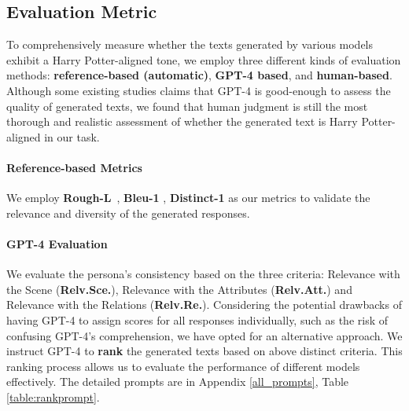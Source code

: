 \documentclass[11pt]{article}
\begin{document}
 \label{experiments}


\subsection{Evaluation Metric}
\label{evaluation_metric}


To comprehensively measure whether the texts generated by various models exhibit a Harry Potter-aligned tone, we employ three different kinds of evaluation methods: \textbf{reference-based (automatic)}, \textbf{GPT-4 based}, and \textbf{human-based}. Although some existing studies \cite{liu2023evaluate,peng2023instruction} claims that GPT-4 is good-enough to assess the quality of generated texts, we found that human judgment is still the most thorough and realistic assessment of whether the generated text is Harry Potter-aligned in our task.



\paragraph{Reference-based Metrics}  
We employ \textbf{Rough-L}~\citep{ROUGE:04}, \textbf{Bleu-1} \citep{BLEU:ACL02}, \textbf{Distinct-1} as our metrics to validate the relevance and diversity of the generated responses.




\paragraph{GPT-4 Evaluation}

We evaluate the persona's consistency based on the three criteria:  Relevance with the Scene (\textbf{Relv.Sce.}), Relevance with the  Attributes (\textbf{Relv.Att.}) and Relevance with the Relations (\textbf{Relv.Re.}). 
Considering the potential drawbacks of having GPT-4   to assign scores for all responses individually, such as the risk of confusing GPT-4's comprehension, we have opted for an alternative approach.  We instruct  GPT-4 to \textbf{rank} the generated texts  based on above distinct criteria. This ranking process allows us to evaluate the performance of different models effectively. The detailed prompts are in Appendix \ref{all_prompts}, Table \ref{table:rankprompt}. 
\end{document}

